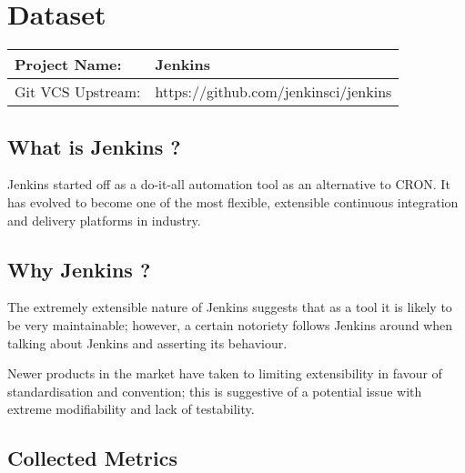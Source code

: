 \section{Dataset}


\begin{table}[H]
	\begin{tabular}{ | l |  l |}
		\hline
		Project Name: & Jenkins \\ 
		\hline
		Git VCS Upstream: & https://github.com/jenkinsci/jenkins\\
		\hline
	\end{tabular}
\end{table}


\subsection{What is Jenkins ?}

Jenkins started off as a do-it-all automation tool as an alternative to CRON. It has evolved to become one of the most flexible, extensible continuous integration and delivery platforms in industry.

\subsection{Why Jenkins ?}

The extremely extensible nature of Jenkins suggests that as a tool it is likely to be very maintainable; however, a certain notoriety follows Jenkins around when talking about Jenkins and asserting its behaviour. 

Newer products in the market have taken to limiting extensibility in favour of standardisation and convention; this is suggestive of a potential issue with extreme modifiability and lack of testability.

\subsection{Collected Metrics}

